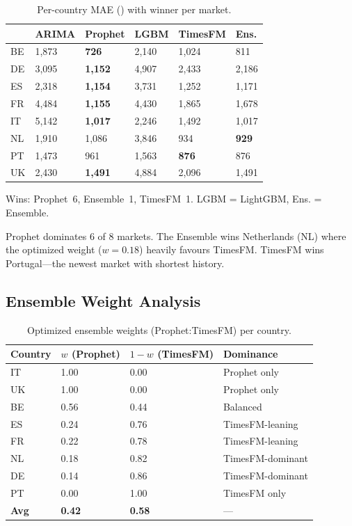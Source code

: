 \documentclass[10pt,twocolumn,a4paper]{article}
\begin{document}
\begin{table}[t]
\caption{Per-country MAE (\texteuro) with winner per market.}
\label{tab:percountry}
\setlength{\tabcolsep}{16pt}
\renewcommand{\arraystretch}{1.4}
\begin{tabular}{l l l l l l}
\toprule
 & \textbf{ARIMA} & \textbf{Prophet} & \textbf{LGBM} & \textbf{TimesFM} & \textbf{Ens.} \\
\midrule
BE & 1,873 & \textbf{726} & 2,140 & 1,024 & 811 \\
DE & 3,095 & \textbf{1,152} & 4,907 & 2,433 & 2,186 \\
ES & 2,318 & \textbf{1,154} & 3,731 & 1,252 & 1,171 \\
FR & 4,484 & \textbf{1,155} & 4,430 & 1,865 & 1,678 \\
IT & 5,142 & \textbf{1,017} & 2,246 & 1,492 & 1,017 \\
NL & 1,910 & 1,086 & 3,846 & 934 & \textbf{929} \\
PT & 1,473 & 961 & 1,563 & \textbf{876} & 876 \\
UK & 2,430 & \textbf{1,491} & 4,884 & 2,096 & 1,491 \\
\bottomrule
\end{tabular}
\begin{flushleft}
\vspace{-2pt}
\scriptsize{Wins: Prophet~6, Ensemble~1, TimesFM~1. LGBM = LightGBM, Ens. = Ensemble.}
\end{flushleft}
\end{table}

Prophet dominates 6 of 8 markets. The Ensemble wins Netherlands (NL) where the optimized weight ($w\!=\!0.18$) heavily favours TimesFM. TimesFM wins Portugal---the newest market with shortest history.

\subsection{Ensemble Weight Analysis}

\begin{table}[t]
\caption{Optimized ensemble weights (Prophet:TimesFM) per country.}
\label{tab:weights}
\setlength{\tabcolsep}{24pt}
\renewcommand{\arraystretch}{1.4}
\begin{tabular}{l l l l}
\toprule
\textbf{Country} & \textbf{$w$ (Prophet)} & \textbf{$1\!-\!w$ (TimesFM)} & \textbf{Dominance} \\
\midrule
IT & 1.00 & 0.00 & Prophet only \\
UK & 1.00 & 0.00 & Prophet only \\
BE & 0.56 & 0.44 & Balanced \\
ES & 0.24 & 0.76 & TimesFM-leaning \\
FR & 0.22 & 0.78 & TimesFM-leaning \\
NL & 0.18 & 0.82 & TimesFM-dominant \\
DE & 0.14 & 0.86 & TimesFM-dominant \\
PT & 0.00 & 1.00 & TimesFM only \\
\midrule
\textbf{Avg} & \textbf{0.42} & \textbf{0.58} & --- \\
\bottomrule
\end{tabular}
\end{table}
\end{document}
